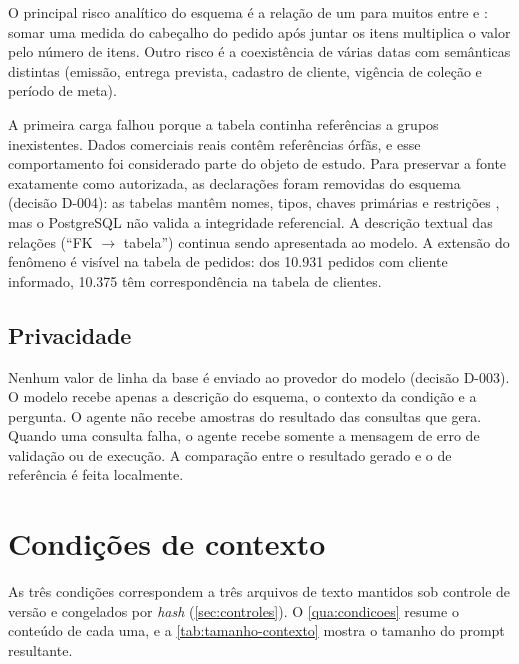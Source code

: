 O principal risco analítico do esquema é a relação de um para muitos entre
 e : somar uma medida do cabeçalho do pedido
após juntar os itens multiplica o valor pelo número de itens. Outro risco
é a coexistência de várias datas com semânticas distintas (emissão, entrega
prevista, cadastro de cliente, vigência de coleção e período de meta).

A primeira carga falhou porque a tabela  continha
referências a grupos inexistentes. Dados comerciais reais contêm
referências órfãs, e esse comportamento foi considerado parte do objeto de
estudo. Para preservar a fonte exatamente como autorizada, as declarações
 foram removidas do esquema (decisão D-004): as tabelas
mantêm nomes, tipos, chaves primárias e restrições , mas o
PostgreSQL não valida a integridade referencial. A descrição textual das
relações (``FK $\rightarrow$ tabela'') continua sendo apresentada ao modelo.
A extensão do fenômeno é visível na tabela de pedidos: dos 10.931 pedidos
com cliente informado, 10.375 têm correspondência na tabela de clientes.

\subsection{Privacidade}
\label{sec:privacidade}

Nenhum valor de linha da base é enviado ao provedor do modelo
(decisão D-003). O modelo recebe apenas a descrição do esquema, o contexto
da condição e a pergunta. O agente não recebe amostras do resultado das
consultas que gera. Quando uma consulta
falha, o agente recebe somente a mensagem de erro de validação ou de
execução. A comparação entre o resultado gerado e o de referência é feita
localmente.

\section{Condições de contexto}
\label{sec:condicoes}

As três condições correspondem a três arquivos de texto mantidos sob
controle de versão e congelados por \textit{hash} (\autoref{sec:controles}).
O \autoref{qua:condicoes} resume o conteúdo de cada uma, e a
\autoref{tab:tamanho-contexto} mostra o tamanho do prompt resultante.

